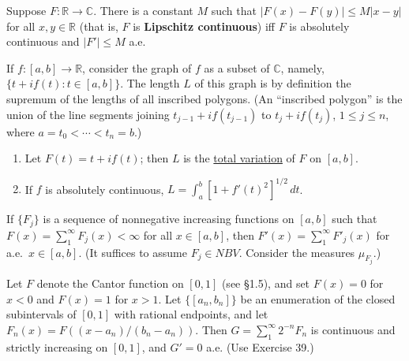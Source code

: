 	\begin{exercise}[Folland 3.37]
		Suppose $F : \mathbb{R} \to \mathbb{C}$. There is a constant $M$ such that $|F(x) - F(y)| \le M|x - y|$ for all $x, y \in \mathbb{R}$ (that is, $F$ is \textbf{Lipschitz continuous}) iff $F$ is absolutely continuous and $|F'| \le M$ a.e.
	\end{exercise}
	\begin{solution}

	\end{solution}

	\begin{exercise}[Folland 3.38]
		If $f : [a, b] \to \mathbb{R}$, consider the graph of $f$ as a subset of $\mathbb{C}$, namely, $\{t + if(t) : t \in [a, b]\}$. The length $L$ of this graph is by definition the supremum of the lengths of all inscribed polygons. (An ``inscribed polygon'' is the union of the line segments joining $t_{j-1} + if(t_{j-1})$ to $t_j + if(t_j)$, $1 \le j \le n$, where $a = t_0 < \cdots < t_n = b$.)
		\begin{enumerate}[label=\textbf{\alph*.}]
			\item Let $F(t) = t + if(t)$; then $L$ is the \hyperref[def:total-variation]{total variation} of $F$ on $[a, b]$.
			\item If $f$ is absolutely continuous, $L = \int_a^b [1 + f'(t)^2]^{1/2} \, dt$.
		\end{enumerate}
	\end{exercise}
	\begin{solution}

	\end{solution}

	\begin{exercise}[Folland 3.39]
		If $\{F_j\}$ is a sequence of nonnegative increasing functions on $[a, b]$ such that $F(x) = \sum_1^\infty F_j(x) < \infty$ for all $x \in [a, b]$, then $F'(x) = \sum_1^\infty F'_j(x)$ for a.e.\ $x \in [a, b]$. (It suffices to assume $F_j \in NBV$. Consider the measures $\mu_{F_j}$.)
	\end{exercise}
	\begin{solution}

	\end{solution}

	\begin{exercise}[Folland 3.40]
		Let $F$ denote the Cantor function on $[0, 1]$ (see \S 1.5), and set $F(x) = 0$ for $x < 0$ and $F(x) = 1$ for $x > 1$. Let $\{[a_n, b_n]\}$ be an enumeration of the closed subintervals of $[0, 1]$ with rational endpoints, and let $F_n(x) = F((x - a_n)/(b_n - a_n))$. Then $G = \sum_1^\infty 2^{-n} F_n$ is continuous and strictly increasing on $[0, 1]$, and $G' = 0$ a.e. (Use Exercise 39.)
	\end{exercise}
	\begin{solution}

	\end{solution}

